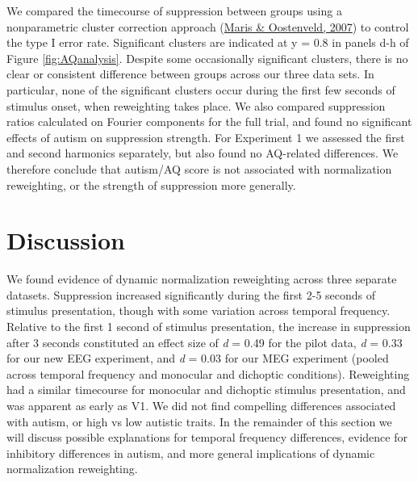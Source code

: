 \documentclass[
]{article}
\begin{document}
We compared the timecourse of suppression between groups using a nonparametric cluster correction approach (\protect\hyperlink{ref-Maris2007}{Maris \& Oostenveld, 2007}) to control the type I error rate. Significant clusters are indicated at y = 0.8 in panels d-h of Figure \ref{fig:AQanalysis}. Despite some occasionally significant clusters, there is no clear or consistent difference between groups across our three data sets. In particular, none of the significant clusters occur during the first few seconds of stimulus onset, when reweighting takes place. We also compared suppression ratios calculated on Fourier components for the full trial, and found no significant effects of autism on suppression strength. For Experiment 1 we assessed the first and second harmonics separately, but also found no AQ-related differences. We therefore conclude that autism/AQ score is not associated with normalization reweighting, or the strength of suppression more generally.

\hypertarget{discussion}{%
\section{Discussion}\label{discussion}}

We found evidence of dynamic normalization reweighting across three separate datasets. Suppression increased significantly during the first 2-5 seconds of stimulus presentation, though with some variation across temporal frequency. Relative to the first 1 second of stimulus presentation, the increase in suppression after 3 seconds constituted an effect size of \emph{d} = 0.49 for the pilot data, \emph{d} = 0.33 for our new EEG experiment, and \emph{d} = 0.03 for our MEG experiment (pooled across temporal frequency and monocular and dichoptic conditions). Reweighting had a similar timecourse for monocular and dichoptic stimulus presentation, and was apparent as early as V1. We did not find compelling differences associated with autism, or high vs low autistic traits. In the remainder of this section we will discuss possible explanations for temporal frequency differences, evidence for inhibitory differences in autism, and more general implications of dynamic normalization reweighting.
\end{document}
